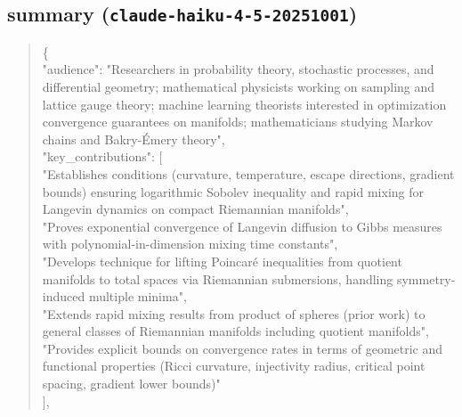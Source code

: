 \documentclass[11pt]{article}
\begin{document}
\subsection*{summary (\texttt{claude-haiku-4-5-20251001})}
\begin{quote}\small\ttfamily\raggedright
\{\\
  "audience": "Researchers in probability theory, stochastic processes, and differential geometry; mathematical physicists working on sampling and lattice gauge theory; machine learning theorists interested in optimization convergence guarantees on manifolds; mathematicians studying Markov chains and Bakry-Émery theory",\\
  "key\_contributions": [\\
    "Establishes conditions (curvature, temperature, escape directions, gradient bounds) ensuring logarithmic Sobolev inequality and rapid mixing for Langevin dynamics on compact Riemannian manifolds",\\
    "Proves exponential convergence of Langevin diffusion to Gibbs measures with polynomial-in-dimension mixing time constants",\\
    "Develops technique for lifting Poincaré inequalities from quotient manifolds to total spaces via Riemannian submersions, handling symmetry-induced multiple minima",\\
    "Extends rapid mixing results from product of spheres (prior work) to general classes of Riemannian manifolds including quotient manifolds",\\
    "Provides explicit bounds on convergence rates in terms of geometric and functional properties (Ricci curvature, injectivity radius, critical point spacing, gradient lower bounds)"\\
  ],\\

\end{quote}
\end{document}
